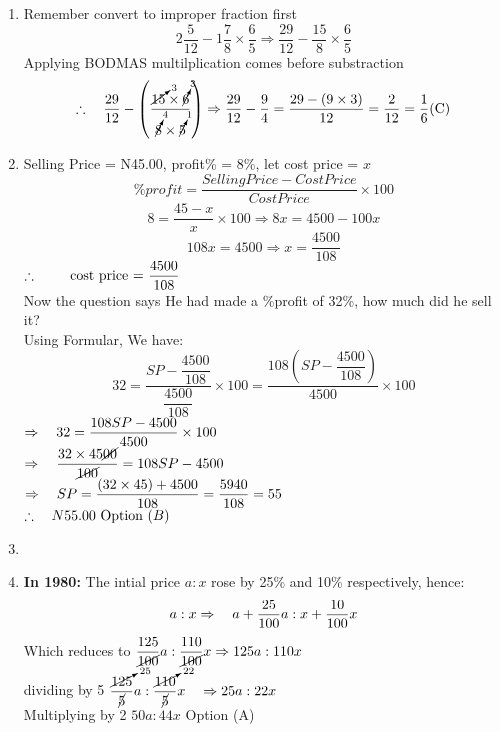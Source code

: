 \begin{multicols}{2}
\begin{enumerate}[label={\arabic*.}]
    \item Remember convert to improper fraction first
    \[2\frac{5}{12} - 1\frac{7}{8} \times \frac{6}{5} \Rightarrow \frac{29}{12} - \frac{15}{8} \times \frac{6}{5}\]
    Applying BODMAS multilplication comes before substraction\\
    \[\therefore \hspace{10px} \dfrac{29}{12} - \left(\dfrac{\cancelto{3}{15} \times \cancelto{3}{6}}{\cancelto{4}{8} \times \cancelto{1}{5}}\right) \Rightarrow \dfrac{29}{12} - \dfrac{9}{4} = \dfrac{29 - (9 \times 3)}{12} = \frac{2}{12} = \frac{1}{6} \text{(C)}\]

    \item Selling Price = N45.00, profit\% = 8\%, let cost price = \(x\)
    \[ \%profit = \frac{Selling Price - Cost Price }{Cost Price} \times 100 \]
       \[8 = \frac{45 - x }{x} \times 100 \Rightarrow 8x = 4500 -100x\]
       \[108x = 4500 \Rightarrow x = \dfrac{4500}{108}  \]
       \(\therefore \hspace{20px} \text{ cost price = }\dfrac{4500}{108}\) \\
       Now the question says He had made a \%profit of 32\%, how much did he sell it? \\
       Using Formular, We have: 
       \[32 = \frac{SP - \dfrac{4500}{108}}{\dfrac{4500}{108}} \times 100 =  \frac{108\left(SP - \dfrac{4500}{108}\right)}{4500} \times 100\]
       \(\Rightarrow \hspace {10px} 32 =  \dfrac{108SP - 4500}{4500} \times 100 \) \\
       \(\Rightarrow \hspace{10px} \dfrac{32 \times 45\cancel{00}}{\cancel{100}} = 108SP - 4500\) \\
       \(\Rightarrow  \hspace{10px} SP = \dfrac{\left(32 \times 45\right) + 4500}{108} = \dfrac{5940}{108} = 55\) \vspace{5px}\\
       \(\therefore \hspace{10px} N55.00 \text{ Option } (B)\)

    \item 

    \item \textbf{In 1980:} The intial price \(a : x\) rose by 25\% and 10\% respectively, hence:
    \[a:x \Rightarrow \hspace{10px} a + \dfrac{25}{100}a : x + \dfrac{10}{100}x\]
    Which reduces to \(\dfrac{125}{\cancel{100}}a : \dfrac{110}{\cancel{100}}x \Rightarrow {125}a : 110x  \) \vspace{5px} \\
    dividing by 5 \( \dfrac{\cancelto{25}{125}}{\cancel{5}} a : \dfrac{\cancelto{22}{110}}{\cancel{5}} x \hspace {10px}\Rightarrow 25a : 22x \) \vspace{5px}\\
    Multiplying by 2 \hspace{10px} \(50a : 44x\) \hspace{5px}Option (A)
    \[\]


\end{enumerate}
\end{multicols}
